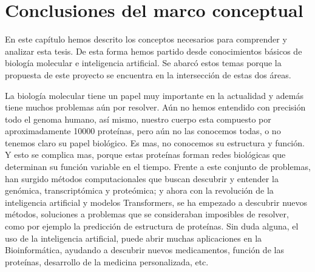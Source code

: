 \section{Conclusiones del marco conceptual}

En este capítulo hemos descrito los conceptos necesarios para comprender y analizar esta tesis. De esta forma hemos partido desde conocimientos básicos de biología molecular e inteligencia artificial. Se abarcó estos temas porque la propuesta de este proyecto se encuentra en la intersección de estas dos áreas.

La biología molecular  tiene un papel muy importante en la actualidad y además tiene muchos problemas aún por resolver. Aún no hemos entendido con precisión todo el genoma humano, así mismo, nuestro cuerpo esta compuesto por aproximadamente 10000 proteínas, pero aún no las conocemos todas, o no tenemos claro su papel biológico. Es mas, no conocemos su estructura y función. Y esto se complica mas, porque estas proteínas forman redes biológicas que determinan su función variable en el tiempo. Frente a este conjunto de problemas, han surgido métodos computacionales que buscan descubrir y entender la genómica, transcriptómica y proteómica; y ahora con la revolución de la inteligencia artificial y modelos Transformers, se ha empezado a descubrir nuevos métodos, soluciones a problemas que se consideraban imposibles de resolver, como por ejemplo la predicción de estructura de proteínas. Sin duda alguna, el uso de la inteligencia artificial, puede abrir muchas aplicaciones en la Bioinformática, ayudando a descubrir nuevos medicamentos, función de las proteínas, desarrollo de la medicina personalizada, etc.


